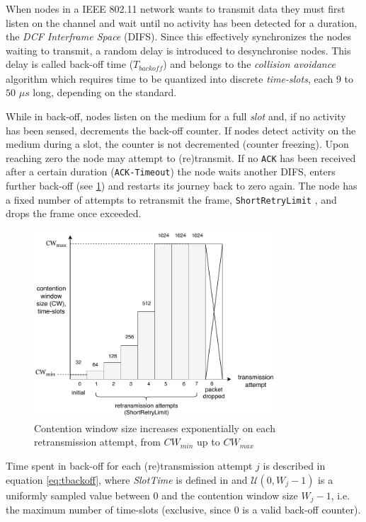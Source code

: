 When nodes in a IEEE 802.11 network wants to transmit data they must first
listen on the channel and wait until no activity has been detected for a
duration, the \emph{DCF Interframe Space} (DIFS). Since this effectively
synchronizes the nodes waiting to transmit, a random delay is introduced to
desynchronise nodes. This delay is called back-off time
($T_{\mathit{backoff}}$) and belongs to the \emph{collision avoidance}
algorithm which requires time to be quantized into discrete \emph{time-slots},
each $9$ to $50$ $\mu s$ long, depending on the standard. 

While in back-off, nodes listen on the medium for a full \emph{slot} and, if
no activity has been sensed, decrements the back-off counter. If nodes detect
activity on the medium during a slot, the counter is not decremented (counter
freezing). Upon reaching zero the node may attempt to (re)transmit. If no
\texttt{ACK} has been received after a certain duration (\texttt{ACK-Timeout})
the node waits another DIFS, enters further back-off (see \ref{fig:cwsizes})
and restarts its journey back to zero again. The node has a fixed number of
attempts to retransmit the frame, \texttt{ShortRetryLimit} \cite{654749}, and
drops the frame once exceeded.

\begin{figure}
\center
\includegraphics[width=0.8\textwidth]{images/contention-window-sizes.pdf}
\caption{Contention window size increases exponentially on each retransmission attempt, from $\mathit{CW}_{min}$ up to $\mathit{CW}_{max}$}
\label{fig:cwsizes}
\end{figure}

Time spent in back-off for each (re)transmission attempt $j$ is described in
equation \ref{eq:tbackoff}, where \emph{SlotTime} is defined in \cite{654749}
and $\mathcal{U}(0,W_j-1)$ is a uniformly sampled value between $0$ and the
contention window size $W_{j}-1$, i.e. the maximum number of time-slots
(exclusive, since 0 is a valid back-off counter). 

